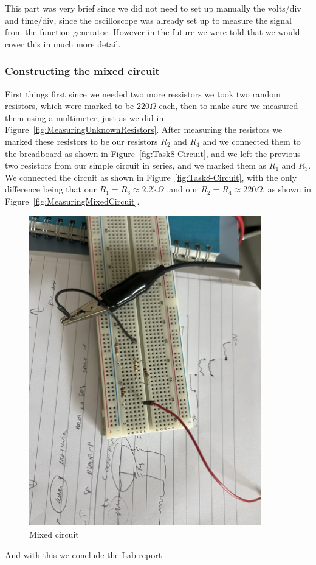 \documentclass[a4paper, 10pt]{article}
\newcommand{\figref}[1]{Figure~\ref{#1}}
\begin{document}
					This part was very brief since we did not need to set up manually the volts/div and time/div, since the oscilloscope was already set up to measure the
					signal from the function generator. However in the future we were told that we would cover this in much more detail.

				\pagebreak
				\subsubsection{Constructing the mixed circuit}
					First things first since we needed two more ressistors we took two random resistors, which were marked to be $220\Omega$ each, then to make sure we
					measured them using a multimeter, just as we did in \figref{fig:MeasuringUnknownResistors}. After measuring the resistors we marked these resistors to
					be our resistors $R_2$ and $R_4$ and we connected them to the breadboard as shown in \figref{fig:Task8-Circuit}, and we left the previous two resistors
					from our simple circuit in series, and we marked them as $R_1$ and $R_3$. We connected the circuit as shown in \figref{fig:Task8-Circuit}, with the only
					difference being that our $R_1 = R_3 \approx 2.2 \text{k}\Omega$ ,and our $R_2 = R_4 \approx 220\Omega$, as shown in \figref{fig:MeasuringMixedCircuit}.
					\begin{figure}[h!]
						\centering
						\includegraphics[angle = 90,width=0.9\textwidth]{./images/MixedCircuit.jpeg}
						\caption{Mixed circuit}
						\label{fig:MixedCircuit}
					\end{figure}

					And with this we conclude the Lab report
\end{document}
